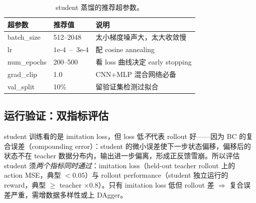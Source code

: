 \begin{table}[H]
\centering
\small
\caption{student 蒸馏的推荐超参数。}
\label{tab:rlmc-priv-hp}
\begin{tabular}{@{}lll@{}}
\toprule
超参数 & 推荐值 & 说明 \\
\midrule
batch\_size & 512--2048 & 太小梯度噪声大，太大收敛慢 \\
lr & $1\text{e-}4$ \,--\, $3\text{e-}4$ & 配 cosine annealing \\
num\_epochs & 200--500 & 看 loss 曲线决定 early stopping \\
grad\_clip & 1.0 & CNN+MLP 混合网络必备 \\
val\_split & 10\% & 留验证集检测过拟合 \\
\bottomrule
\end{tabular}
\end{table}

\subsection{运行验证：双指标评估}
\label{sec:rlmc-priv-eval}

\begin{insight}[蒸馏成功需双指标同时通过]\label{ins:rlmc-priv-distmetric}
student 训练看的是 imitation loss，但 loss 低\emph{不}代表 rollout 好——因为 BC 的复合误差（compounding error）：student 的微小误差使下一步状态偏移，偏移后的状态不在 teacher 数据分布内，输出进一步偏离，形成正反馈雪崩。所以评估 student 须\emph{两个指标同时通过}：imitation loss（held-out teacher rollout 上的 action MSE，典型 $<0.05$）与 rollout performance（student 独立运行的 reward，典型 $\ge$ teacher $\times 0.8$）。只有 imitation loss 低但 rollout 差 $\Rightarrow$ 复合误差严重，需增数据多样性或上 DAgger。
\end{insight}


